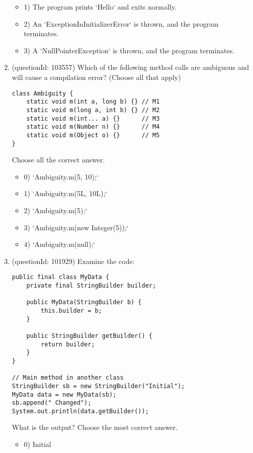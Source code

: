 \documentclass[12pt]{article}
\begin{document}
\begin{enumerate}[label=(\arabic*)]
\begin{itemize}
\item 1) The program prints `Hello` and exits normally.

\item 2) An `ExceptionInInitializerError` is thrown, and the program terminates.

\item 3) A `NullPointerException` is thrown, and the program terminates.

\end{itemize}
\item (questionId: 103557) Which of the following method calls are ambiguous and will cause a compilation error? (Choose all that apply)
\begin{verbatim}
class Ambiguity {
    static void m(int a, long b) {} // M1
    static void m(long a, int b) {} // M2
    static void m(int... a) {}      // M3
    static void m(Number n) {}      // M4
    static void m(Object o) {}      // M5
}
\end{verbatim}
Choose all the correct answer.\begin{itemize}
\item 0) `Ambiguity.m(5, 10);`

\item 1) `Ambiguity.m(5L, 10L);`

\item 2) `Ambiguity.m(5);`

\item 3) `Ambiguity.m(new Integer(5));`

\item 4) `Ambiguity.m(null);`

\end{itemize}
\item (questionId: 101929) Examine the code:
\begin{verbatim}
public final class MyData {
    private final StringBuilder builder;

    public MyData(StringBuilder b) {
        this.builder = b;
    }

    public StringBuilder getBuilder() {
        return builder;
    }
}

// Main method in another class
StringBuilder sb = new StringBuilder("Initial");
MyData data = new MyData(sb);
sb.append(" Changed");
System.out.println(data.getBuilder());
\end{verbatim}
What is the output?
Choose the most correct answer. 
\begin{itemize}
\item 0) Initial


\end{itemize}
\end{enumerate}
\end{document}
